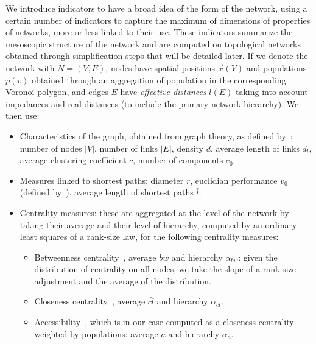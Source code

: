 \documentclass[11pt]{article}
\begin{document}

We introduce indicators to have a broad idea of the form of the network, using a certain number of indicators to capture the maximum of dimensions of properties of networks, more or less linked to their use. These indicators summarize the mesoscopic structure of the network and are computed on topological networks obtained through simplification steps that will be detailed later. If we denote the network with $N=(V,E)$, nodes have spatial positions $\vec{x}(V)$ and populations $p(v)$ obtained through an aggregation of population in the corresponding Voronoï polygon, and edges $E$ have \emph{effective distances} $l(E)$ taking into account impedances and real distances (to include the primary network hierarchy). We then use:


\begin{itemize}
\item Characteristics of the graph, obtained from graph theory, as defined by~\cite{haggett1970network}: number of nodes $\left|V\right|$, number of links $\left|E\right|$, density $d$, average length of links $\bar{d_l}$, average clustering coefficient $\bar{c}$, number of components $c_0$.
\item Measures linked to shortest paths: diameter $r$, euclidian performance $v_0$ (defined by~\cite{banos2012towards}), average length of shortest paths $\bar{l}$.
\item Centrality measures: these are aggregated at the level of the network by taking their average and their level of hierarchy, computed by an ordinary least squares of a rank-size law, for the following centrality measures:
\begin{itemize}
\item Betweenness centrality~\citep{crucitti2006centrality}, average $\bar{bw}$ and hierarchy $\alpha_{bw}$: given the distribution of centrality on all nodes, we take the slope of a rank-size adjustment and the average of the distribution.
\item Closeness centrality~\citep{crucitti2006centrality}, average $\bar{cl}$ and hierarchy $\alpha_{cl}$.
\item Accessibility~\citep{hansen1959accessibility}, which is in our case computed as a closeness centrality weighted by populations: average $\bar{a}$ and hierarchy $\alpha_{a}$.
\end{itemize}
\end{itemize}
\end{document}

